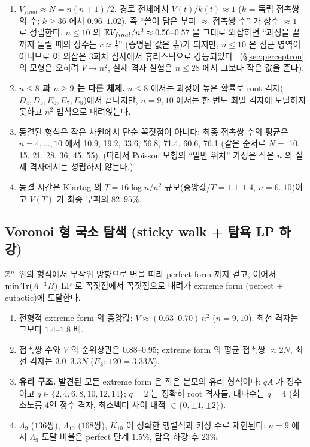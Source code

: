 \begin{observation}\tagN
\begin{enumerate}
\item \textbf{$V_{final}\approx N=n(n+1)/2$.} 경로 전체에서 $V(t)/k(t)\approx1$ ($k$ = 독립 접촉쌍의 수; $k\ge36$ 에서 $0.96$--$1.02$). 즉 ``쓸어 담은 부피 $\approx$ 접촉쌍 수'' 가 상수 $\approx1$ 로 성립한다. $n\le10$ 의 $\mathbb{E} V_{final}/n^2\approx0.56$--$0.57$ 을 그대로 외삽하면 ``과정을 끝까지 돌릴 때의 상수는 $c\approx\tfrac12$'' (증명된 값은 $\tfrac1{2e}$)가 되지만, $n\le10$ 은 점근 영역이 아니므로 이 외삽은 3회차 심사에서 휴리스틱으로 강등되었다 \tagH\ (\S\ref{sec:perceptron} 의 모형은 오히려 $V\to n^2$, 실제 격자 실험은 $n\le28$ 에서 그보다 작은 값을 준다).
\item \textbf{$n\le8$ 과 $n\ge9$ 는 다른 체제.} $n\le8$ 에서는 과정이 높은 확률로 root 격자($D_4,D_5,E_6,E_7,E_8$)에서 끝나지만, $n=9,10$ 에서는 한 번도 최밀 격자에 도달하지 못하고 $n^2$ 법칙으로 내려앉는다.
\item 동결된 형식은 작은 차원에서 단순 꼭짓점이 아니다: 최종 접촉쌍 수의 평균은 $n=4,\dots,10$ 에서 10.9, 19.2, 33.6, 56.8, 71.4, 60.6, 76.1 (같은 순서로 $N=$ 10, 15, 21, 28, 36, 45, 55). (따라서 Poisson 모형의 ``일반 위치'' 가정은 작은 $n$ 의 실제 격자에서는 성립하지 않는다.)
\item 동결 시간은 Klartag 의 $T=16\log n/n^2$ 규모(중앙값/$T$ = $1.1$--$1.4$, $n=6..10$)이고 $V(T)$ 가 최종 부피의 $82$--$95\%$.
\end{enumerate}
\end{observation}

\subsection{Voronoi 형 국소 탐색 (sticky walk + 탐욕 LP 하강)}
$\mathbb{Z}^n$ 위의 형식에서 무작위 방향으로 면을 따라 perfect form 까지 걷고, 이어서 $\min\mathrm{Tr}(A^{-1}B)$ LP 로 꼭짓점에서 꼭짓점으로 내려가 extreme form (perfect + eutactic)에 도달한다.
\begin{observation}\tagN
\begin{enumerate}
\item 전형적 extreme form 의 중앙값: $V\approx(0.63\text{--}0.70)\,n^2$ ($n=9,10$). 최선 격자는 그보다 $1.4$--$1.8$ 배.
\item 접촉쌍 수와 $V$ 의 순위상관은 $0.88$--$0.95$; extreme form 의 평균 접촉쌍 $\approx2N$, 최선 격자는 $3.0$--$3.3N$ ($E_8$: $120=3.33N$).
\item \textbf{유리 구조.} 발견된 모든 extreme form 은 작은 분모의 유리 형식이다: $qA$ 가 정수이고 $q\in\{2,4,6,8,10,12,14\}$; $q=2$ 는 정확히 root 격자들, 대다수는 $q=4$ (최소노름 4인 정수 격자, 최소벡터 사이 내적 $\in\{0,\pm1,\pm2\}$).
\item $\Lambda_9$ ($136$쌍), $\Lambda_{10}$ ($168$쌍), $K_{10}$ 이 정확한 행렬식과 키싱 수로 재현된다; $n=9$ 에서 $\Lambda_9$ 도달 비율은 perfect 단계 $1.5\%$, 탐욕 하강 후 $23\%$.
\end{enumerate}
\end{observation}


